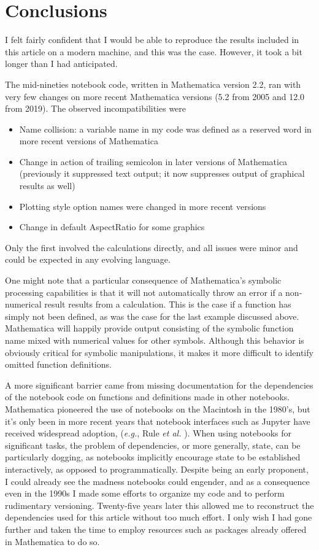 \section{Conclusions}

I felt fairly confident that I would be able to reproduce the results included in this article on a modern machine, and this was the case. However, it took a bit longer than I had anticipated.

The mid-nineties notebook code, written in Mathematica version 2.2, ran with very few changes on more recent Mathematica versions  (5.2 from 2005 and 12.0 from 2019). The observed incompatibilities were
\begin{itemize}
\item Name collision: a variable name in my code was defined as a reserved word in more recent versions of Mathematica
\item Change in action of trailing semicolon in later versions of Mathematica (previously it suppressed text output; it now suppresses output of graphical results as well)
\item Plotting style option names were changed in more recent versions
\item Change in default AspectRatio for some graphics
\end{itemize}
Only the first involved the calculations directly, and all issues were minor and could be expected in any evolving language.

One might note that a particular consequence of Mathematica's symbolic processing capabilities is that it will not automatically throw an error if a non-numerical result results from a calculation. This is the case if a function has simply not been defined, as was the case for the last example discussed above. Mathematica will happily provide output consisting of the symbolic function name mixed with numerical values for other symbols. Although this behavior is obviously critical for symbolic manipulations, it makes it more difficult to identify omitted function definitions.
 
A more significant barrier came from missing documentation for the dependencies of the notebook code on functions and definitions made in other notebooks. Mathematica pioneered the use of notebooks on the Macintosh in the 1980's, but it's only been in more recent years that notebook interfaces such as Jupyter have received widespread adoption, (\textit{e.g.}, Rule \textit{et al.} \supercite{Rule2019}). When using notebooks for significant tasks, the problem of dependencies, or more generally, state, can be particularly dogging, as notebooks implicitly encourage state to be established interactively, as opposed to programmatically. Despite being an early proponent, I could already see the madness notebooks could engender, and as a consequence even in the 1990s I made some efforts to organize my code and to perform rudimentary versioning. Twenty-five years later this allowed me to reconstruct the dependencies used for this article without too much effort. I only wish I had gone further and taken the time to employ resources such as packages already offered in Mathematica to do so.

